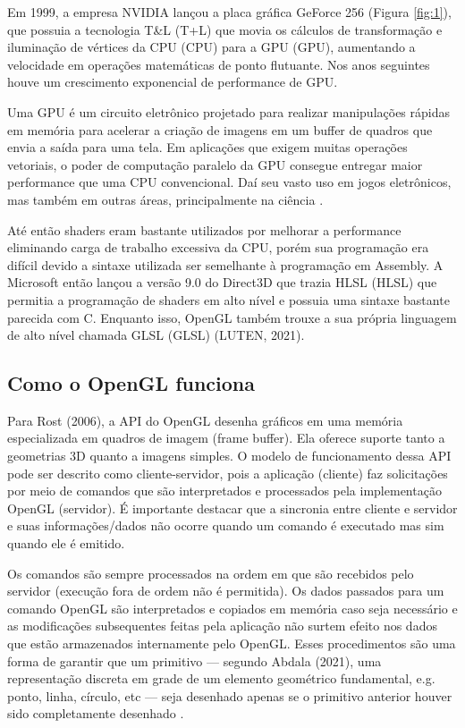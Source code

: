 Em 1999, a empresa NVIDIA lançou a placa gráfica GeForce 256 (Figura \ref{fig:1}), que possuia a tecnologia T\&L (\acrlong{T+L}) que movia os cálculos de transformação e iluminação de vértices da CPU (\acrlong{CPU}) para a \acrshort{GPU} (\acrlong{GPU}), aumentando a velocidade em operações matemáticas de ponto flutuante. Nos anos seguintes houve um crescimento exponencial de performance de \acrshort{GPU}.

Uma GPU é um circuito eletrônico projetado para realizar manipulações rápidas em memória para acelerar a criação de imagens em um buffer de quadros que envia a saída para uma tela. Em aplicações que exigem muitas operações vetoriais, o poder de computação paralelo da GPU consegue entregar maior performance que uma CPU convencional. Daí seu vasto uso em jogos eletrônicos, mas também em outras áreas, principalmente na ciência \cite{shea2013gpu}.

Até então shaders eram bastante utilizados por melhorar a performance eliminando carga de trabalho excessiva da \acrshort{CPU}, porém sua programação era difícil devido a sintaxe utilizada ser semelhante à programação em Assembly. A Microsoft então lançou a versão 9.0 do Direct3D que trazia \acrlong{HLSL} (HLSL) que permitia a programação de shaders em alto nível e possuia uma sintaxe bastante parecida com C. Enquanto isso, OpenGL também trouxe a sua própria linguagem de alto nível chamada GLSL (\acrlong{GLSL}) (LUTEN, 2021)\nocite{openGLBook}. 

\subsection{Como o OpenGL funciona}
\label{sec:como-opengl-funciona}

Para Rost (2006), a API do OpenGL desenha gráficos em uma memória especializada em quadros de imagem (frame buffer). Ela oferece suporte tanto a geometrias 3D quanto a imagens simples. O modelo de funcionamento dessa API pode ser descrito como cliente-servidor, pois a aplicação (cliente) faz solicitações por meio de comandos que são interpretados e processados pela implementação OpenGL (servidor). É importante destacar que a sincronia entre cliente e servidor e suas informações/dados não ocorre quando um comando é executado mas sim quando ele é emitido.

Os comandos são sempre processados na ordem em que são recebidos pelo servidor (execução fora de ordem não é permitida). Os dados passados para um comando OpenGL são interpretados e copiados em memória caso seja necessário e as modificações subsequentes feitas pela aplicação não surtem efeito nos dados que estão armazenados internamente pelo OpenGL. Esses procedimentos são uma forma de garantir que um primitivo --- segundo Abdala (2021)\nocite{abdala}, uma representação discreta em grade de um elemento geométrico fundamental, e.g. ponto, linha, círculo, etc --- seja desenhado apenas se o primitivo anterior houver sido completamente desenhado \cite{GLSLBook}.

